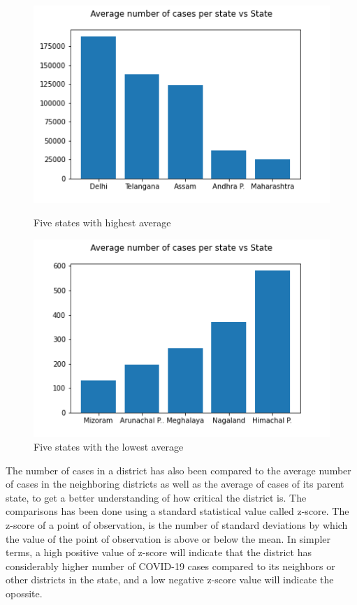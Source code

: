 \documentclass[a4paper,11pt]{article}
\begin{document}
\begin{figure}[!tbp]
  \centering
  \begin{minipage}[b]{0.45\textwidth}
    \includegraphics[width=\textwidth]{high-states.png}
    \caption{Five states with highest average}
  \end{minipage}
  \hfill
  \begin{minipage}[b]{0.45\textwidth}
    \includegraphics[width=\textwidth]{low-states.png}
    \caption{Five states with the lowest average}
  \end{minipage}
\end{figure}


The number of cases in a district has also been compared to the average number of cases in the neighboring districts as well as the average of cases of its parent state, to get a better understanding of how critical the district is. The comparisons has been done using a standard statistical value called z-score. The z-score of a point of observation, is the number of standard deviations by which the value of the point of observation is above or below the mean. In simpler terms, a high positive value of z-score will indicate that the district has considerably higher number of COVID-19 cases compared to its neighbors or other districts in the state, and a low negative z-score value will indicate the opossite. \par
\end{document}
